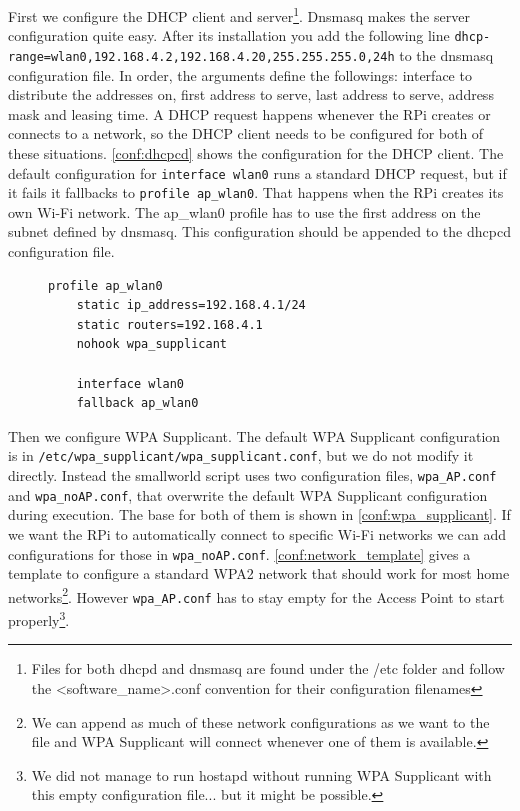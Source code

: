 \documentclass[a4paper,11pt,oneside]{report}
\begin{document}
First we configure the DHCP client and server\footnote{Files for both dhcpd and dnsmasq are found under the /etc folder and follow the <software\_name>.conf convention for their configuration filenames}. Dnsmasq makes the server configuration quite easy. After its installation you add the following line \verb|dhcp-range=wlan0,192.168.4.2,192.168.4.20,255.255.255.0,24h| to the dnsmasq configuration file. In order, the arguments define the followings: interface to distribute the addresses on, first address to serve, last address to serve, address mask and leasing time. A DHCP request happens whenever the RPi creates or connects to a network, so the DHCP client needs to be configured for both of these situations. \autoref{conf:dhcpcd} shows the configuration for the DHCP client. The default configuration for \verb|interface wlan0| runs a standard DHCP request, but if it fails it fallbacks to \verb|profile ap_wlan0|. That happens when the RPi creates its own Wi-Fi network. The ap\_wlan0 profile has to use the first address on the subnet defined by dnsmasq. This configuration should be appended to the dhcpcd configuration file.

\begin{figure}
\begin{lstlisting}[label=conf:dhcpcd, caption=DHCP client configuration]
    profile ap_wlan0
    static ip_address=192.168.4.1/24
    static routers=192.168.4.1
    nohook wpa_supplicant

    interface wlan0
    fallback ap_wlan0
\end{lstlisting}
\end{figure}

Then we configure WPA Supplicant. The default WPA Supplicant configuration is in \verb|/etc/wpa_supplicant/wpa_supplicant.conf|, but we do not modify it directly. Instead the smallworld script uses two configuration files, \verb|wpa_AP.conf| and \verb|wpa_noAP.conf|, that overwrite the default WPA Supplicant configuration during execution. The base for both of them is shown in \autoref{conf:wpa_supplicant}. If we want the RPi to automatically connect to specific Wi-Fi networks we can add configurations for those in \verb|wpa_noAP.conf|. \autoref{conf:network_template} gives a template to configure a standard WPA2 network that should work for most home networks\footnote{We can append as much of these network configurations as we want to the file and WPA Supplicant will connect whenever one of them is available.}. However \verb|wpa_AP.conf| has to stay empty for the Access Point to start properly\footnote{We did not manage to run hostapd without running WPA Supplicant with this empty configuration file... but it might be possible.}.
\end{document}
